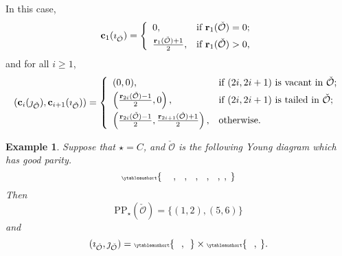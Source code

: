 \documentclass[12pt]{amsart}
\let\ytb=\ytableaushort
\newcommand{\tytb}[1]{{\tiny\ytb{#1}}}
\newcommand{\CO}{{\mathcal {O}}}
\numberwithin{equation}{section}
\newtheorem{eg}[thm]{Example}
\theoremstyle{remark}
\def\CPP{\mathrm{PP}}
\begin{document}
 In this case,
\[
  \mathbf c_{1}(\imath_{\check \CO})= \left\{
    \begin{array}{ll}
      0,  &\hbox{if $\mathbf r_1(\check \CO)=0$}; \smallskip\\
      \frac{\mathbf r_1(\check \CO)+1}{2},   &\hbox{if $\mathbf r_1(\check \CO)>0$},\\
    \end{array}
  \right.
\]
and for all $i\geq 1$,
\[
  (\mathbf c_{i}(\jmath_{\check \CO}), \mathbf c_{i+1}(\imath_{\check \CO}))= \left\{
    \begin{array}{ll}
      (0,  0), &\hbox{if $(2i, 2i+1)$ is vacant in $\check \CO$};\smallskip\\
      \left  (\frac{\mathbf r_{2i}(\check \CO)-1}{2},  0\right ), & \hbox{if $(2i, 2i+1)$ is tailed in $\check \CO$};\smallskip\\
      \left  (\frac{\mathbf r_{2i}(\check \CO)-1}{2},  \frac{\mathbf r_{2i+1}(\check \CO)+1}{2}\right ), &\hbox{otherwise}.\\
    \end{array}
  \right.
\]




\begin{eg} Suppose that $\star=C$, and $\check \CO$ is the following Young
  diagram which has good parity.
  \begin{equation*}%
    \tytb{\ \ \ \ \  , \ \ \  , \ \ \ , \ \ \  , \ \ \ , \  ,\  }
  \end{equation*}
  Then
  \[
    \CPP_\star(\check \CO)=\{(1,2), (5,6)\}
  \]
  and
  \[
    (\imath_{\check \CO}, \jmath_{\check \CO})= \tytb{\ \ \ ,\ \ } \times \tytb{\ \ \ , \ }.
  \]


\end{eg}
\end{document}
